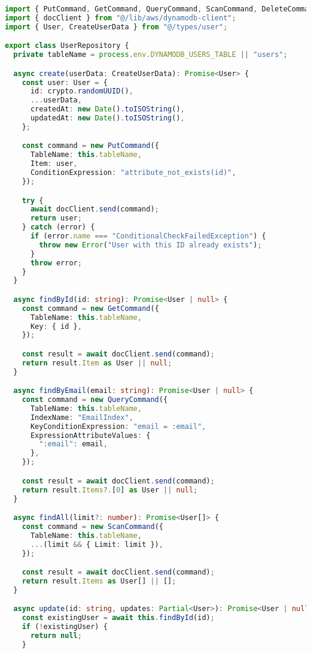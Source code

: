 \begin{lstlisting}[language=TypeScript, caption=User Repository Implementation]
import { PutCommand, GetCommand, QueryCommand, ScanCommand, DeleteCommand } from "@aws-sdk/lib-dynamodb";
import { docClient } from "@/lib/aws/dynamodb-client";
import { User, CreateUserData } from "@/types/user";

export class UserRepository {
  private tableName = process.env.DYNAMODB_USERS_TABLE || "users";

  async create(userData: CreateUserData): Promise<User> {
    const user: User = {
      id: crypto.randomUUID(),
      ...userData,
      createdAt: new Date().toISOString(),
      updatedAt: new Date().toISOString(),
    };

    const command = new PutCommand({
      TableName: this.tableName,
      Item: user,
      ConditionExpression: "attribute_not_exists(id)",
    });

    try {
      await docClient.send(command);
      return user;
    } catch (error) {
      if (error.name === "ConditionalCheckFailedException") {
        throw new Error("User with this ID already exists");
      }
      throw error;
    }
  }

  async findById(id: string): Promise<User | null> {
    const command = new GetCommand({
      TableName: this.tableName,
      Key: { id },
    });

    const result = await docClient.send(command);
    return result.Item as User || null;
  }

  async findByEmail(email: string): Promise<User | null> {
    const command = new QueryCommand({
      TableName: this.tableName,
      IndexName: "EmailIndex",
      KeyConditionExpression: "email = :email",
      ExpressionAttributeValues: {
        ":email": email,
      },
    });

    const result = await docClient.send(command);
    return result.Items?.[0] as User || null;
  }

  async findAll(limit?: number): Promise<User[]> {
    const command = new ScanCommand({
      TableName: this.tableName,
      ...(limit && { Limit: limit }),
    });

    const result = await docClient.send(command);
    return result.Items as User[] || [];
  }

  async update(id: string, updates: Partial<User>): Promise<User | null> {
    const existingUser = await this.findById(id);
    if (!existingUser) {
      return null;
    }


\end{lstlisting}

